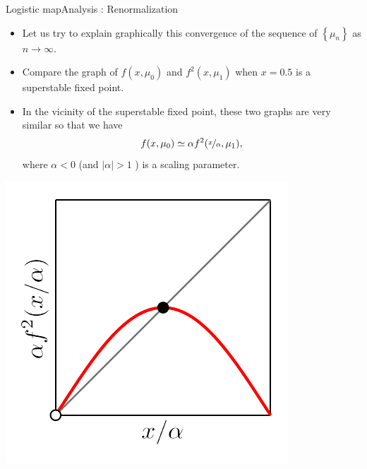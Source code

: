 \documentclass[usenames,dvipsnames,svgnames,10pt,aspectratio=169]{beamer}
\begin{document}
\begin{frame}[t, c]{Logistic map}{Analysis : Renormalization}
	\begin{minipage}{.68\textwidth}
		\begin{itemize}
			\item Let us try to explain graphically this convergence of the sequence of \( \left\{ \mu_n \right\} \) as \( n \to \infty \).

			\medskip

			\item Compare the graph of \(f(x, \mu_0)\) and \(f^2(x, \mu_1)\) when \(x = 0.5\) is a superstable fixed point.

			\medskip

			\item In the vicinity of the superstable fixed point, these two graphs are very similar so that we have
			\[
				f(x, \mu_0) \simeq \alpha f^2(\nicefrac{x}{\alpha}, \mu_1),
			\]
			where \( \alpha < 0 \) (and \( \vert \alpha \vert > 1\) ) is a scaling parameter.
		\end{itemize}
	\end{minipage}%
	\hfill
	\begin{minipage}{.28\textwidth}
		\centering
		\includegraphics[width=\textwidth]{renormalization_3}
	\end{minipage}

	\vspace{1cm}
\end{frame}
\end{document}
